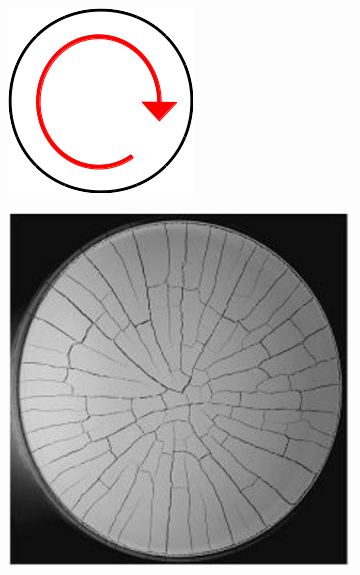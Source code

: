 \begin{figure}[htb!]
  \begin{subfigure}{0.14\textwidth}
    \includegraphics[width=\textwidth]{Chapter4/figures/2D/radial_schematic.png}
    \caption{}
  \end{subfigure}
  \hspace{0.02\textwidth}
  \begin{subfigure}{0.14\textwidth}
    \includegraphics[width=\textwidth]{Chapter4/figures/2D/paste_radial.png}

\end{subfigure}
\end{figure}

